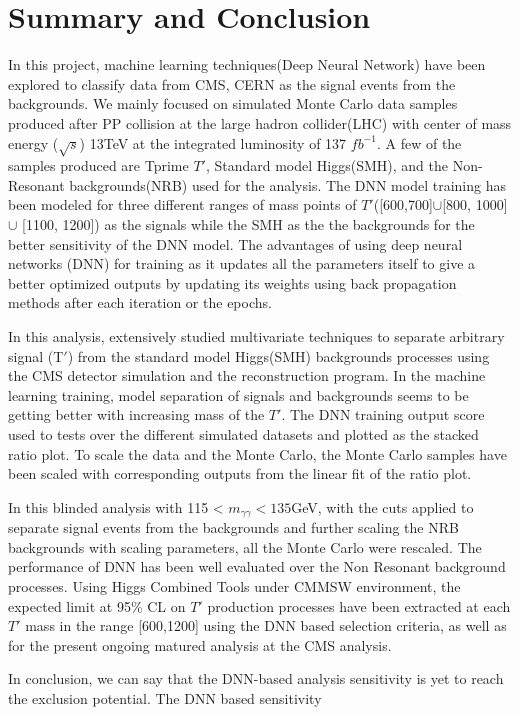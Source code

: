 \chapter{\label{summary}Summary and Conclusion}
In this project, machine learning techniques(Deep Neural Network) have been explored to classify data from CMS, CERN as the signal events from the backgrounds. We mainly focused on simulated Monte Carlo data samples produced after PP collision at the large hadron collider(LHC) with center of mass energy ($\sqrt{s}$) 13TeV at the integrated luminosity of 137 $fb^{-1}$. A few of the samples produced are Tprime $T'$, Standard model Higgs(SMH), and the Non-Resonant backgrounds(NRB) used for the analysis. The DNN model training has been modeled for three different ranges of mass points of $T'$([600,700]$\cup$[800, 1000]$\cup$ [1100, 1200]) as the signals while the SMH as the the backgrounds for the better sensitivity of the DNN model. The advantages of using deep neural networks (DNN) for training  as it updates all the parameters itself to give a better optimized outputs by updating its weights using back propagation methods after each iteration or the epochs.

In this analysis, extensively studied multivariate techniques to separate arbitrary signal (T$'$) from the standard model Higgs(SMH) backgrounds processes using the CMS detector simulation and the reconstruction program. In the machine learning training, model separation of signals and backgrounds seems to be getting better with increasing mass of the $T'$.  The DNN training output score used to tests over the different simulated datasets and plotted as the stacked ratio plot. To scale the data and the Monte Carlo, the Monte Carlo samples have been scaled with corresponding outputs from the linear fit of the ratio plot.  

In this blinded analysis with 115 < $m_{\gamma\gamma}< 135$GeV, with the cuts applied to separate signal events from the backgrounds and further scaling the NRB backgrounds with scaling parameters, all the Monte Carlo were rescaled. The performance of DNN has been well evaluated over the Non Resonant background processes. Using Higgs Combined Tools under CMMSW environment, the expected limit at 95\% CL on $T'$ production processes have been extracted at each $T'$ mass in the range
[600,1200] using the DNN based selection criteria, as well as for the present ongoing matured analysis at the CMS analysis. 

In conclusion, we can say that the DNN-based analysis sensitivity is yet to reach the exclusion potential. The DNN based sensitivity 

